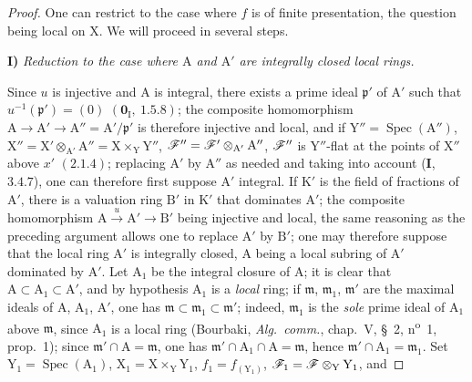 \begin{proof}
One can restrict to the case where $f$ is of finite presentation, the question being local
on $\mathrm{X}$. We will proceed in several steps.

\medskip
\noindent\textbf{I)} \emph{Reduction to the case where $\mathrm{A}$ and $\mathrm{A}'$ are integrally closed local rings.}

\medskip
Since $u$ is injective and $\mathrm{A}$ is integral, there exists a prime ideal $\mathfrak{p}'$ of $\mathrm{A}'$ such that
$u^{-1}(\mathfrak{p}')=(0)$ $(\mathbf{0}_\mathrm{I},~1.5.8)$; the composite homomorphism $\mathrm{A}\to\mathrm{A}'\to\mathrm{A}''=\mathrm{A}'/\mathfrak{p}'$ is therefore injective
and local, and if $\mathrm{Y}''=\operatorname{Spec}(\mathrm{A}'')$, $\mathrm{X}''=\mathrm{X}'\otimes_{\mathrm{A}'}\mathrm{A}''=\mathrm{X}\times_\mathrm{Y}\mathrm{Y}''$, $\mathscr{F}''=\mathscr{F}'\otimes_{\mathrm{A}'}\mathrm{A}''$, $\mathscr{F}''$ is $\mathrm{Y}''$-flat
at the points of $\mathrm{X}''$ above $x'$ $(2.1.4)$; replacing $\mathrm{A}'$ by $\mathrm{A}''$ as needed and taking
into account (\textbf{I},~$3.4.7$), one can therefore first suppose $\mathrm{A}'$ integral. If $\mathrm{K}'$ is the field of
fractions of $\mathrm{A}'$, there is a valuation ring $\mathrm{B}'$ in $\mathrm{K}'$ that dominates $\mathrm{A}'$; the composite
homomorphism $\mathrm{A}\xrightarrow{u}\mathrm{A}'\to\mathrm{B}'$ being injective and local, the same reasoning as
the preceding argument allows one to replace $\mathrm{A}'$ by $\mathrm{B}'$; one may therefore suppose that the local ring $\mathrm{A}'$ is integrally closed,
$\mathrm{A}$ being a local subring of $\mathrm{A}'$ dominated by $\mathrm{A}'$. Let $\mathrm{A}_1$ be the integral closure of $\mathrm{A}$; it is clear that
$\mathrm{A}\subset\mathrm{A}_1\subset\mathrm{A}'$, and by hypothesis $\mathrm{A}_1$ is a \emph{local} ring;
if $\mathfrak{m}$, $\mathfrak{m}_1$, $\mathfrak{m}'$ are the maximal ideals of $\mathrm{A}$, $\mathrm{A}_1$, $\mathrm{A}'$, one has $\mathfrak{m}\subset\mathfrak{m}_1\subset\mathfrak{m}'$; indeed, $\mathfrak{m}_1$ is
the \emph{sole} prime ideal of $\mathrm{A}_1$ above $\mathfrak{m}$, since $\mathrm{A}_1$ is a local ring (Bourbaki,
\emph{Alg.\ comm.}, chap.~V, \S~2, n\textsuperscript{o}~1, prop.~1); since $\mathfrak{m}'\cap\mathrm{A}=\mathfrak{m}$, one has $\mathfrak{m}'\cap\mathrm{A}_1\cap\mathrm{A}=\mathfrak{m}$,
hence $\mathfrak{m}'\cap\mathrm{A}_1=\mathfrak{m}_1$. Set $\mathrm{Y}_1=\operatorname{Spec}(\mathrm{A}_1)$, $\mathrm{X}_1=\mathrm{X}\times_\mathrm{Y}\mathrm{Y}_1$, $f_1=f_{(\mathrm{Y}_1)}$, $\mathscr{F}_1=\mathscr{F}\otimes_\mathrm{Y}\mathrm{Y}_1$, and

\end{proof}
